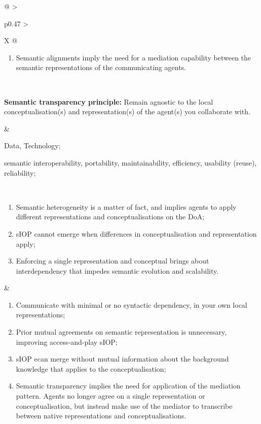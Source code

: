 \begin{xltabular}[l]{\linewidth}{@{} >{\small\raggedright\arraybackslash}p{0.47\linewidth} >{\small\raggedright\arraybackslash}X @{}}
\begin{enumerate}[left=10pt, nosep]
  \item Semantic alignments imply the need for a mediation capability between the semantic representations of the communicating agents.
\end{enumerate} \\
%
%
%
\begin{mmdp}\label{dp:st}{\bfseries Semantic transparency principle:}
\quad Remain agnostic to the local conceptualisation(s) and representation(s) of the agent(s) you collaborate with. \end{mmdp}
&
\begin{description}[labelwidth=3.7cm,leftmargin=3.7cm+1ex,nosep,topsep=2ex,labelsep=1ex,font=\bfseries]
\item[Type of information:] Data, Technology;
\item[Quality attributes:] semantic interoperability, portability, maintainability, efficiency, usability (reuse), reliability;
\end{description}
\\
\begin{enumerate}[left=6pt, nosep]
  \item Semantic heterogeneity is a matter of fact, and implies agents to apply different representations and conceptualisations on the DoA;
  \item sIOP cannot emerge when differences in conceptualisation and representation apply;
  \item Enforcing a single representation and conceptual brings about interdependency that impedes semantic evolution and scalability.
\end{enumerate}
&
\begin{enumerate}[left=10pt, nosep]
  \item Communicate with minimal or no syntactic dependency, in your own local representations;
  \item Prior mutual agreements on semantic representation is unnecessary, improving access-and-play sIOP;
  \item sIOP ecan merge without mutual information about the background knowledge that applies to the conceptualisation;
  \item Semantic transparency implies the need for application of the mediation pattern. Agents no longer agree on a single representation or conceptualisation, but instead make use of the mediator to transcribe between native representations and conceptualisations.
\end{enumerate} \\

\end{xltabular}
